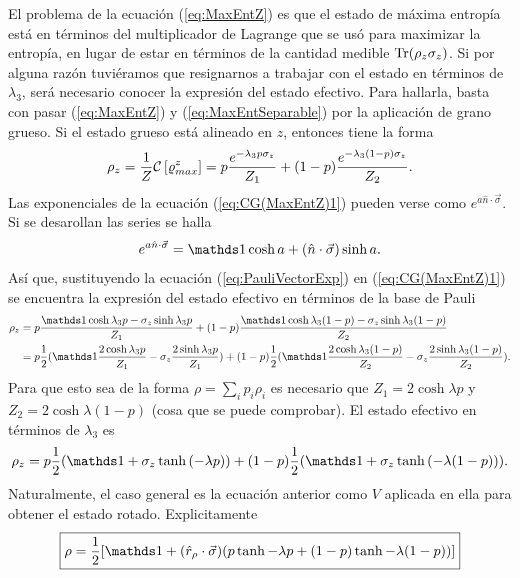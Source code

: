 El problema de la ecuación (\ref{eq:MaxEntZ}) es que el estado de máxima entropía está en términos del multiplicador de Lagrange que se usó para maximizar la entropía, en lugar de estar en términos de la cantidad medible $\Tr(\rho_{z}\sigma_{z})$. Si por alguna razón tuviéramos que resignarnos a trabajar con el estado en términos de $\lambda_{3}$, será necesario conocer la expresión del estado efectivo. Para hallarla, basta con pasar (\ref{eq:MaxEntZ}) y (\ref{eq:MaxEntSeparable}) por la aplicación de grano grueso. Si el estado grueso está alineado en $z$, entonces tiene la forma
\begin{equation}\label{eq:CG(MaxEntZ)1}
    \rho_{z}=\frac{1}{Z}\mathcal{C}\left[\varrho_{max}^{z}\right]=p\frac{e^{-\lambda_{3}p\sigma_{z}}}{Z_{1}}+(1-p)\frac{e^{-\lambda_{3}(1-p)\sigma_{z}}}{Z_{2}}.
\end{equation}
Las exponenciales de la ecuación (\ref{eq:CG(MaxEntZ)1}) pueden verse como $e^{a\hat{n}\cdot \vec{\sigma}}$. Si se desarollan las series se halla
\begin{equation}\label{eq:PauliVectorExp}
    e^{a\hat{n}\cdot \vec{\sigma}}=\Id \cosh{a}+(\hat{n}\cdot \vec{\sigma})\sinh{a}.
\end{equation}
Así que, sustituyendo la ecuación (\ref{eq:PauliVectorExp}) en (\ref{eq:CG(MaxEntZ)1}) se encuentra la expresión del estado efectivo en términos de la base de Pauli
\begin{align*}
    \rho_{z}&=p\frac{\Id \cosh{\lambda_{3}p}-\sigma_{z}\sinh{\lambda_{3}p}}{Z_{1}}+(1-p)\frac{\Id \cosh{\lambda_{3}(1-p)}-\sigma_{z}\sinh{\lambda_{3}(1-p)}}{Z_{2}}\\
    &=p\frac{1}{2}(\Id \frac{2\cosh{\lambda_{3}p}}{Z_{1}}-\sigma_{z}\frac{2\sinh{\lambda_{3}p}}{Z_{1}})+(1-p)\frac{1}{2}(\Id \frac{2\cosh{\lambda_{3}(1-p)}}{Z_{2}}-\sigma_{z}\frac{2\sinh{\lambda_{3}(1-p)}}{Z_{2}}).
\end{align*}
Para que esto sea de la forma $\rho=\sum_{i}p_{i}\rho_{i}$ es necesario que $Z_{1}=2\cosh{\lambda p}$ y $Z_{2}=2\cosh{\lambda (1-p)}$ (cosa que se puede comprobar). El estado efectivo en términos de $\lambda_{3}$ es
\begin{equation}\label{eq:CG(MaxEntZ)2}
    \rho_{z}=p\frac{1}{2}(\Id+\sigma_{z}\tanh{(-\lambda p)})+(1-p)\frac{1}{2}(\Id+\sigma_{z}\tanh{(-\lambda (1-p))}).
\end{equation}
Naturalmente, el caso general es la ecuación anterior como $V$ aplicada en ella para obtener el estado rotado. Explicitamente
\begin{equation}\label{eq:CG(MaxEnt)}
  \boxed{\rho=\frac{1}{2}[\Id+(\hat{r}_{\rho}\cdot\vec{\sigma})(p\tanh{-\lambda p}+(1-p)\tanh{-\lambda (1-p)})]}
\end{equation}
